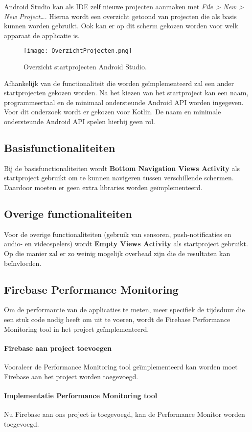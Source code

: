 Android Studio kan als IDE zelf nieuwe projecten aanmaken met \textit{File > New > New Project\dots}. 
Hierna wordt een overzicht getoond van projecten die als basis kunnen worden gebruikt. Ook 
kan er op dit scherm gekozen worden voor welk apparaat de applicatie is.
\begin{figure}[H]
    \centering
    \texttt{[image: OverzichtProjecten.png]}
    \caption{Overzicht startprojecten Android Studio.}
\end{figure}
Afhankelijk van de functionaliteit die worden geïmplementeerd zal een ander 
startprojecten gekozen worden. Na het kiezen van het startproject kan een naam, 
programmeertaal en de minimaal ondersteunde Android API worden ingegeven. Voor dit onderzoek wordt er gekozen 
voor Kotlin. De naam en minimale ondersteunde Android API spelen hierbij geen rol.

\subsection{Basisfunctionaliteiten}
\label{par:basisfunctionaliteiten}
Bij de basisfunctionaliteiten wordt
\textbf{Bottom Navigation Views Activity} als startproject gebruikt om te kunnen navigeren tussen 
verschillende schermen. Daardoor moeten er geen extra libraries worden geïmplementeerd.

\subsection{Overige functionaliteiten}
Voor de overige functionaliteiten (gebruik van sensoren, 
push-notificaties en audio- en videospelers) wordt
\textbf{Empty Views Activity} als startproject gebruikt. Op die manier zal er zo weinig mogelijk 
\gls{overhead} zijn die de resultaten kan beïnvloeden.

\subsection{Firebase Performance Monitoring}
Om de performantie van de applicaties te meten, meer specifiek de tijdsduur 
die een stuk code nodig heeft om uit te voeren, 
wordt de Firebase Performance Monitoring tool in het project geïmplementeerd. 

\paragraph{Firebase aan project toevoegen}
Vooraleer de Performance Monitoring tool geïmplementeerd kan worden moet Firebase 
aan het project worden toegevoegd.



\paragraph{Implementatie Performance Monitoring tool}
Nu Firebase aan ons project is toegevoegd, kan de Performance Monitor 
worden toegevoegd.


